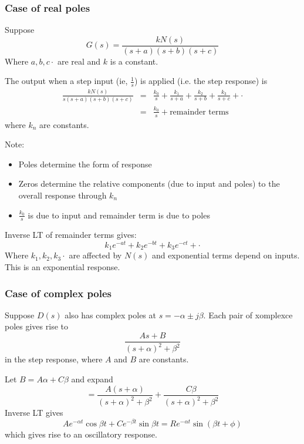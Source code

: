 \documentclass[11pt]{article} %
\theoremstyle{definition}
\begin{document}
\subsubsection{Case of real poles}
	Suppose
	\begin{equation}
		G(s) = \frac{k N(s)}{(s+a)(s+b)(s+c)}
	\end{equation}
	Where $a, b, c\cdot$ are real and $k$ is a constant.

		The output when a step input (ie, $\frac{1}{s}$) is applied (i.e. the step response) is
	\begin{eqnarray}
		\frac{k N(s)}{s(s+a)(s+b)(s+c)} &=&  \frac{k_0}{s} + \frac{k_1}{s+a} +  \frac{k_2}{s+b} + \frac{k_3}{s+c} +\cdot \nonumber \\
		&=& \frac{k_0}{s} + \mbox{remainder terms}
	\end{eqnarray}
	where $k_n$ are constants.

	Note:
	\begin{itemize}
		\item Poles determine the form of response
		\item Zeros determine the relative components (due to input and poles) to the overall response through $k_n$
		\item $\frac{k_0}{s}$ is due to input and remainder term is due to poles
	\end{itemize}

	Inverse LT of remainder terms gives:
	\begin{equation}
		k_1e^{-at}+k_2e^{-bt}+k_3e^{-ct}+\cdot
		\label{eq:invltreal}
	\end{equation}
	Where $k_1, k_2, k_3 \cdot$ are affected by $N(s)$ and exponential terms depend on inputs. This is an exponential response.

\subsubsection{Case of complex poles}
	Suppose $D(s)$ also has complex poles at $s=-\alpha\pm j\beta$. Each pair of xomplexce poles gives rise to 
	\begin{equation}
		\frac{As+B}{(s+\alpha)^2+\beta^2}
	\end{equation}
	in the step response, where $A$ and $B$ are constants.

	Let  $B=A\alpha + C\beta$ and expand
	\begin{equation}
		=\frac{A(s+\alpha)}{(s+\alpha)^2+\beta^2}+\frac{C\beta}{(s+\alpha)^2+\beta^2}
	\end{equation}
	Inverse LT gives
	\begin{equation}
		Ae^{-\alpha t}\cos{\beta t}+Ce^{-\beta t}\sin{\beta t}= Re^{-\alpha t} \sin{(\beta t+\phi)}
		\label{eq:invltcomplex}
	\end{equation}
	which gives rise to an oscillatory response.
\end{document}
